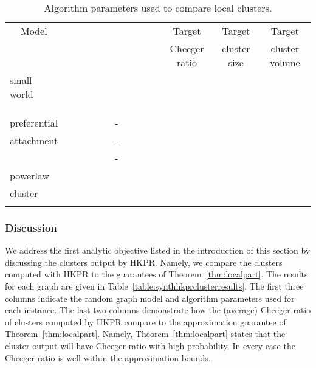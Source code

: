 \documentclass[runningheads,a4paper]{llncs}
\begin{document}
\begin{table}
\centering
\begin{tabular}{|p{2.6cm}|c|c|c|c|c|c|c|}
\hline
\multicolumn{1}{|c|}{Model}& ~~ & ~~ & ~~~~ & ~~~~ & Target        & Target       & Target\\
       &           &       &         &                & Cheeger ratio & cluster size & cluster volume\\
\hline\hline
small world  &    &  &  &  &  &   & \\
             &    &  &  &  &  &  & \\
             &    &  &  &  &  &  & \\
             &   &  &  &  &  &  & \\\hline
preferential &    &  &   -   &  &  &   & \\
attachment   &    &  &   -   &  &  &  & \\
             &    &  &   -   &  &  &  & \\\hline
powerlaw     &    &  &  &  &  &   & \\
cluster      &    &  &  &  &  &  & \\
             &    &  &  &  &  &  & \\
\hline
\end{tabular}
\caption{Algorithm parameters used to compare local clusters.}
\label{table:synthclusterparams} 
\end{table}


\subsubsection{Discussion} We address the first analytic objective listed in the
introduction of this section by discussing the clusters output by
HKPR.  Namely, we compare the clusters computed with HKPR to
the guarantees of Theorem~\ref{thm:localpart}.  The results for each graph are
given in Table~\ref{table:synthhkprclusterresults}.  The first three columns
indicate the random graph model and algorithm parameters used for each instance.
The last two columns demonstrate how the (average) Cheeger ratio of clusters
computed by HKPR compare to the approximation guarantee of
Theorem~\ref{thm:localpart}.  Namely, Theorem~\ref{thm:localpart} states that
the cluster output will have Cheeger ratio  with high
probability.  In every case the Cheeger ratio is well within the approximation
bounds.
\end{document}

